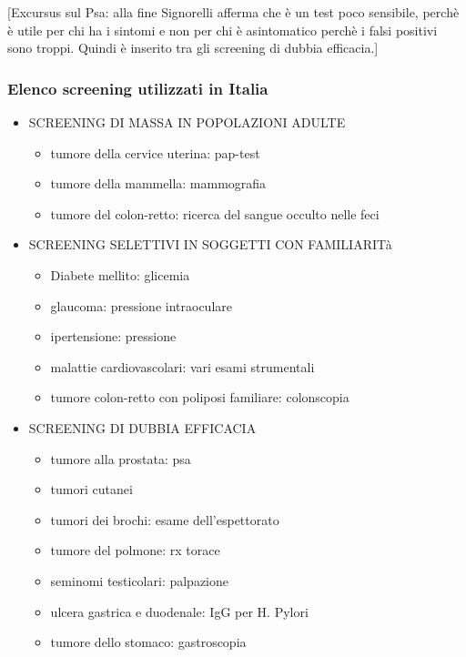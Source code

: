 {[}Excursus sul Psa: alla fine Signorelli afferma che è un test poco
sensibile, perchè è utile per chi ha i sintomi e non per chi è
asintomatico perchè i falsi positivi sono troppi. Quindi è inserito tra
gli screening di dubbia efficacia.{]}

\subsubsection{Elenco screening utilizzati in Italia}

\begin{itemize}

\item SCREENING DI MASSA IN POPOLAZIONI ADULTE

\begin{itemize}
\item
  tumore della cervice uterina: pap-test
\item
  tumore della mammella: mammografia
\item
  tumore del colon-retto: ricerca del sangue occulto nelle feci
\end{itemize}

\item SCREENING SELETTIVI IN SOGGETTI CON FAMILIARITà

\begin{itemize}
\item
  Diabete mellito: glicemia
\item
  glaucoma: pressione intraoculare
\item
  ipertensione: pressione
\item
  malattie cardiovascolari: vari esami strumentali
\item
  tumore colon-retto con poliposi familiare: colonscopia
\end{itemize}

\item SCREENING DI DUBBIA EFFICACIA

\begin{itemize}
\item
  tumore alla prostata: psa
\item
  tumori cutanei
\item
  tumori dei brochi: esame dell'espettorato
\item
  tumore del polmone: rx torace
\item
  seminomi testicolari: palpazione
\item
  ulcera gastrica e duodenale: IgG per H. Pylori
\item
  tumore dello stomaco: gastroscopia
\end{itemize}


\end{itemize}
